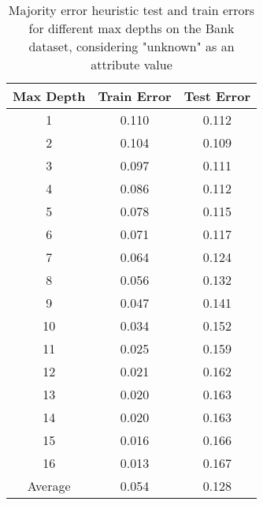 \documentclass[12pt, fullpage,letterpaper]{article}
\begin{document}
\begin{enumerate}
\begin{enumerate}
\newpage
\begin{table}[ht]
	\centering
	\begin{tabular}{|c|c|c|}
        \hline
		Max Depth & Train Error & Test Error\\ 
		\hline\hline
		1 & 0.110 & 0.112 \\ \hline
		2 & 0.104 & 0.109 \\ \hline
		3 & 0.097 & 0.111 \\ \hline
		4 & 0.086 & 0.112 \\ \hline
		5 & 0.078 & 0.115 \\ \hline
		6 & 0.071 & 0.117 \\ \hline
		7 & 0.064 & 0.124 \\ \hline
		8 & 0.056 & 0.132 \\ \hline
		9 & 0.047 & 0.141 \\ \hline
		10 & 0.034 & 0.152 \\ \hline
		11 & 0.025 & 0.159 \\ \hline
		12 & 0.021 & 0.162 \\ \hline
		13 & 0.020 & 0.163 \\ \hline
		14 & 0.020 & 0.163 \\ \hline
		15 & 0.016 & 0.166 \\ \hline
		16 & 0.013 & 0.167 \\ \hline
		Average & 0.054 & 0.128 \\ \hline
	\end{tabular}
	\caption{Majority error heuristic test and train errors for different max depths on the Bank dataset, considering "unknown" as an attribute value}
    \label{table:3amajorityerror}
\end{table}


\end{enumerate}
\end{enumerate}
\end{document}
